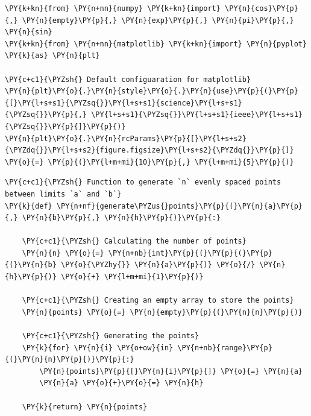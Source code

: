     \begin{tcolorbox}[breakable, size=fbox, boxrule=1pt, pad at break*=1mm,colback=cellbackground, colframe=cellborder]
\begin{Verbatim}[commandchars=\\\{\}]
\PY{k+kn}{from} \PY{n+nn}{numpy} \PY{k+kn}{import} \PY{n}{cos}\PY{p}{,} \PY{n}{empty}\PY{p}{,} \PY{n}{exp}\PY{p}{,} \PY{n}{pi}\PY{p}{,} \PY{n}{sin}
\PY{k+kn}{from} \PY{n+nn}{matplotlib} \PY{k+kn}{import} \PY{n}{pyplot} \PY{k}{as} \PY{n}{plt}

\PY{c+c1}{\PYZsh{} Default configuaration for matplotlib}
\PY{n}{plt}\PY{o}{.}\PY{n}{style}\PY{o}{.}\PY{n}{use}\PY{p}{(}\PY{p}{[}\PY{l+s+s1}{\PYZsq{}}\PY{l+s+s1}{science}\PY{l+s+s1}{\PYZsq{}}\PY{p}{,} \PY{l+s+s1}{\PYZsq{}}\PY{l+s+s1}{ieee}\PY{l+s+s1}{\PYZsq{}}\PY{p}{]}\PY{p}{)}
\PY{n}{plt}\PY{o}{.}\PY{n}{rcParams}\PY{p}{[}\PY{l+s+s2}{\PYZdq{}}\PY{l+s+s2}{figure.figsize}\PY{l+s+s2}{\PYZdq{}}\PY{p}{]} \PY{o}{=} \PY{p}{(}\PY{l+m+mi}{10}\PY{p}{,} \PY{l+m+mi}{5}\PY{p}{)}
\end{Verbatim}
\end{tcolorbox}

    \begin{tcolorbox}[breakable, size=fbox, boxrule=1pt, pad at break*=1mm,colback=cellbackground, colframe=cellborder]
\begin{Verbatim}[commandchars=\\\{\}]
\PY{c+c1}{\PYZsh{} Function to generate `n` evenly spaced points between limits `a` and `b`}
\PY{k}{def} \PY{n+nf}{generate\PYZus{}points}\PY{p}{(}\PY{n}{a}\PY{p}{,} \PY{n}{b}\PY{p}{,} \PY{n}{h}\PY{p}{)}\PY{p}{:}

    \PY{c+c1}{\PYZsh{} Calculating the number of points}
    \PY{n}{n} \PY{o}{=} \PY{n+nb}{int}\PY{p}{(}\PY{p}{(}\PY{p}{(}\PY{n}{b} \PY{o}{\PYZhy{}} \PY{n}{a}\PY{p}{)} \PY{o}{/} \PY{n}{h}\PY{p}{)} \PY{o}{+} \PY{l+m+mi}{1}\PY{p}{)}

    \PY{c+c1}{\PYZsh{} Creating an empty array to store the points}
    \PY{n}{points} \PY{o}{=} \PY{n}{empty}\PY{p}{(}\PY{n}{n}\PY{p}{)}

    \PY{c+c1}{\PYZsh{} Generating the points}
    \PY{k}{for} \PY{n}{i} \PY{o+ow}{in} \PY{n+nb}{range}\PY{p}{(}\PY{n}{n}\PY{p}{)}\PY{p}{:}
        \PY{n}{points}\PY{p}{[}\PY{n}{i}\PY{p}{]} \PY{o}{=} \PY{n}{a}
        \PY{n}{a} \PY{o}{+}\PY{o}{=} \PY{n}{h}

    \PY{k}{return} \PY{n}{points}
\end{Verbatim}
\end{tcolorbox}

